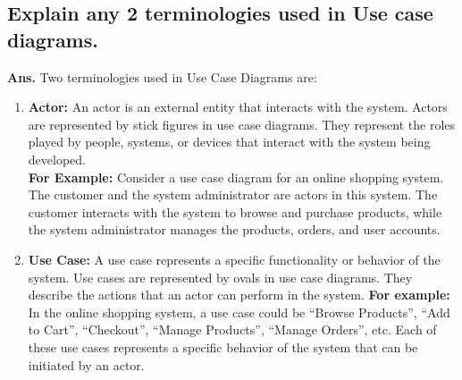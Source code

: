 \documentclass{article}
\begin{document}
\subsection{Explain any 2 terminologies used in Use case diagrams.}
\textbf{Ans.} Two terminologies used in Use Case Diagrams are:
\begin{enumerate}
	\item \textbf{Actor:} An actor is an external entity that interacts with the system. Actors are represented by stick figures in use case diagrams. They represent the roles played by people, systems, or devices that interact with the system being developed.\\
	\textbf{For Example:} Consider a use case diagram for an online shopping system. The customer and the system administrator are actors in this system. The customer interacts with the system to browse and purchase products, while the system administrator manages the products, orders, and user accounts.
	\item \textbf{Use Case:} A use case represents a specific functionality or behavior of the system. Use cases are represented by ovals in use case diagrams. They describe the actions that an actor can perform in the system.
	\textbf{For example:} In the online shopping system, a use case could be ``Browse Products'', ``Add to Cart'', ``Checkout'', ``Manage Products'', ``Manage Orders'', etc. Each of these use cases represents a specific behavior of the system that can be initiated by an actor.
\end{enumerate}
\end{document}
